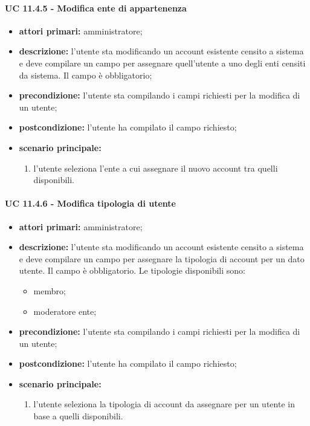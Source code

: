 				\paragraph{UC 11.4.5 - Modifica ente di appartenenza}
				\begin{itemize}
					\item \textbf{attori primari:} amministratore;
					\item \textbf{descrizione:} l'utente sta modificando un account esistente censito a sistema e deve compilare un campo per assegnare quell'utente a uno degli enti censiti da sistema. Il campo è obbligatorio;
					\item \textbf{precondizione:} l'utente sta compilando i campi richiesti per la modifica di un utente;
					\item \textbf{postcondizione:} l'utente ha compilato il campo richiesto;
					\item \textbf{scenario principale:}
					\begin{enumerate}
						\item{l'utente seleziona l'ente a cui assegnare il nuovo account tra quelli disponibili.}
					\end{enumerate}
				\end{itemize}

				\paragraph{UC 11.4.6 - Modifica tipologia di utente}
				\begin{itemize}
					\item \textbf{attori primari:} amministratore;
					\item \textbf{descrizione:} l'utente sta modificando un account esistente censito a sistema e deve compilare un campo per assegnare la tipologia di account per un dato utente. Il campo è obbligatorio. Le tipologie disponibili sono:
					\begin{itemize}
						\item membro;
						\item moderatore ente;
					\end{itemize}
					\item \textbf{precondizione:} l'utente sta compilando i campi richiesti per la modifica di un utente;
					\item \textbf{postcondizione:} l'utente ha compilato il campo richiesto;
					\item \textbf{scenario principale:}
					\begin{enumerate}
						\item{l'utente seleziona la tipologia di account da assegnare per un utente in base a quelli disponibili.}
					\end{enumerate}
				\end{itemize}

